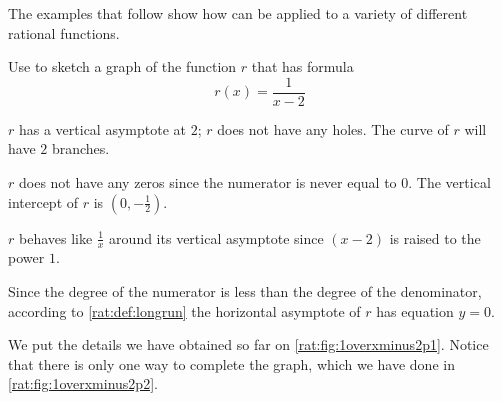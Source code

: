 The examples that follow show how  can be
applied to a variety of different rational functions.

\begin{pccexample}\label{rat:ex:1overxminus2p2}
Use  to sketch a graph of the function $r$ 
that has formula
\[
	r(x)=\frac{1}{x-2}
\]
\begin{pccsolution}
\begin{steps}
	\item $r$ has a vertical asymptote at $2$; $r$ does not have any holes. The curve of 
	$r$ will have $2$ branches.
	\item $r$ does not have any zeros since the numerator is never equal to $0$. The
	vertical intercept of $r$ is $\left( 0,-\frac{1}{2} \right)$.
	\item $r$ behaves like $\frac{1}{x}$ around its vertical asymptote since $(x-2)$
	is raised to the power $1$.
	\item Since the degree of the numerator is less than the degree of the denominator, 
	according to \vref{rat:def:longrun} the horizontal asymptote of $r$ has equation $y=0$.
	\item We put the details we have obtained so far on \cref{rat:fig:1overxminus2p1}. Notice 
	that there is only one way to complete the graph, which we have done in \cref{rat:fig:1overxminus2p2}.
\end{steps}
\end{pccsolution}
\end{pccexample}

